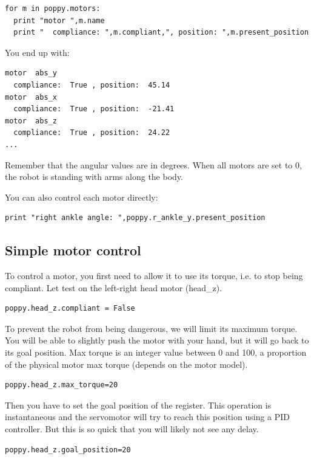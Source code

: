 \documentclass{article}
\begin{document}
\begin{verbatim}
for m in poppy.motors:
  print "motor ",m.name
  print "  compliance: ",m.compliant,", position: ",m.present_position
\end{verbatim}

You end up with:

\begin{verbatim}
motor  abs_y
  compliance:  True , position:  45.14
motor  abs_x
  compliance:  True , position:  -21.41
motor  abs_z
  compliance:  True , position:  24.22
...
\end{verbatim}

Remember that the angular values are in degrees. When all motors are set to 0, the robot is standing with arms along the body.

You can also control each motor directly:

\begin{verbatim}
print "right ankle angle: ",poppy.r_ankle_y.present_position
\end{verbatim}

\subsection{Simple motor control}

To control a motor, you first need to allow it to use its torque, i.e. to stop being compliant. Let test on the left-right head motor (head\_z).

\begin{verbatim}
poppy.head_z.compliant = False
\end{verbatim}

To prevent the robot from being dangerous, we will limit its maximum torque. You will be able to slightly push the motor with your hand, but it will go back to its goal position. Max torque is an integer value between 0 and 100, a proportion of the physical motor max torque (depends on the motor model).

\begin{verbatim}
poppy.head_z.max_torque=20
\end{verbatim}

Then you have to set the goal position of the register. This operation is instantaneous and the servomotor will try to reach this position using a PID controller. But this is so quick that you will likely not see any delay.

\begin{verbatim}
poppy.head_z.goal_position=20
\end{verbatim}
\end{document}
